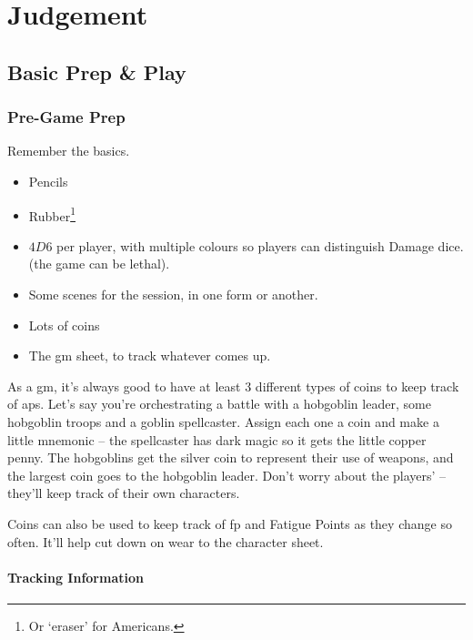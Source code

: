 \chapter[Bastion of Judgement]{Judgement}
\label{judgement}

\section{Basic Prep \& Play}

\begin{multicols}{2}

\subsection{Pre-Game Prep}

Remember the basics.


\begin{itemize}
  \item
  Pencils
  \item
  Rubber\footnote{Or `eraser' for Americans.}
  \item
  $4D6$ per player, with multiple colours so players can distinguish Damage dice.
  \iftoggle{stories}{
    \item
    A boat-load of character sheets
  }{
    Some pre-made characters, including spares
  } (the game can be lethal).
  \item
  Some scenes for the session, in one form or another.
  \item
  Lots of coins
  \item
  The \gls{gm} sheet, to track whatever comes up.
\end{itemize}

As a \gls{gm}, it's always good to have at least 3 different types of coins to keep track of \glspl{ap}.
Let's say you're orchestrating a battle with a hobgoblin leader, some hobgoblin troops and a goblin spellcaster.
Assign each one a coin and make a little mnemonic -- the spellcaster has dark magic so it gets the little copper penny.
The hobgoblins get the silver coin to represent their use of weapons, and the largest coin goes to the hobgoblin leader.
Don't worry about the players'  -- they'll keep track of their own characters.

Coins can also be used to keep track of \gls{fp} and Fatigue Points as they change so often.
It'll help cut down on wear to the character sheet.

\subsubsection{Tracking Information}


\end{multicols}
